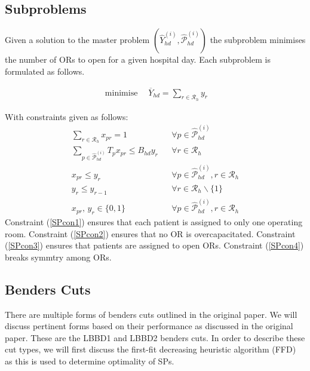 \subsection{Subproblems}
Given a solution to the master problem $(\widehat{Y}^{(i)}_{hd}, \widehat{\mathcal{P}}^{(i)}_{hd})$ the 
subproblem minimises the number of ORs to open for a given hospital day. Each subproblem is
formulated as follows.

\begin{table}[H]
    \caption*{\bf{ADDITIONAL VARIABLES}}
\end{table}
\begin{align}
    \operatorname*{minimise} \quad \overline{Y}_{hd} = \sum\limits_{r \in \mathcal{R}_h}y_r
\end{align}

With constraints given as follows:
\begin{align}
    \sum\limits_{r\in\mathcal{R}_h}x_{pr} = 1 && \forall p \in \widehat{\mathcal{P}}^{(i)}_{hd}\label{SPcon1}\\
    \sum\limits_{p \in \widehat{\mathcal{P}}^{(i)}_{hd}} T_px_{pr} \leq B_{hd}y_r 
    && \forall r \in \mathcal{R}_h \label{SPcon2}\\
    x_{pr} \leq y_r && \forall p \in \widehat{\mathcal{P}}^{(i)}_{hd}, r \in \mathcal{R}_h \label{SPcon3}\\
    y_r \leq y_{r-1} && \forall r \in \mathcal{R}_h \backslash \{1\}\label{SPcon4}\\
    x_{pr},\,y_r\in\{0,1\} && \forall p \in \widehat{\mathcal{P}}^{(i)}_{hd}, r \in \mathcal{R}_h\label{SPcon5}
\end{align}
Constraint (\ref*{SPcon1}) ensures that each patient is assigned to only one operating room.
Constraint (\ref*{SPcon2}) ensures that no OR is overcapacitated. Constraint (\ref*{SPcon3})
ensures that patients are assigned to open ORs. Constraint (\ref*{SPcon4}) breaks symmtry
among ORs.

\subsection{Benders Cuts}
There are multiple forms of benders cuts outlined in the original paper. We will discuss
pertinent forms based on their performance as discussed in the original paper. These are 
the LBBD1 and LBBD2 benders cuts. In order to describe these cut types, we will first discuss the 
first-fit decreasing heuristic algorithm (FFD) as this is used to determine optimality of SPs. 

